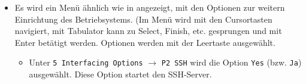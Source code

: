 \begin{itemize}
{%
		Danach wird folgender Befehl eingegeben und mit \lstinline|Enter| bestätigt:\\
		\lstinline|sudo raspi-config|
		}
	\item {Es wird ein Menü ähnlich wie in  angezeigt, mit den Optionen zur weitern Einrichtung des Betriebsystems. 
		(Im Menü wird mit den Cursortasten navigiert, mit Tabulator kann zu Select, Finish, etc. gesprungen und mit Enter betätigt werden. Optionen werden mit der Leertaste ausgewählt.
		\begin{itemize}
		\item {Unter \lstinline|5 Interfacing Options| $\rightarrow$ \lstinline|P2 SSH| wird die Option \lstinline|Yes| (bzw. \lstinline|Ja|) ausgewählt. 
			Diese Option startet den SSH-Server.}

\end{itemize}}
\end{itemize}
